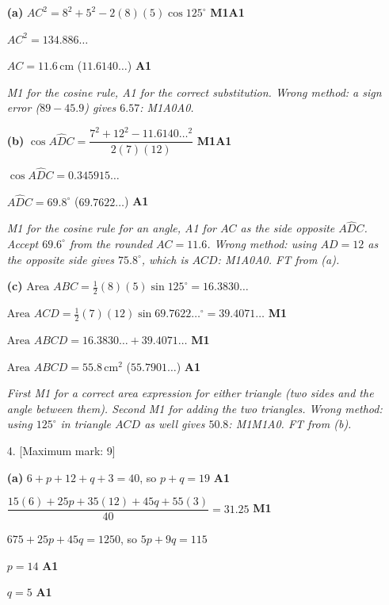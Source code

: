 \documentclass[12pt, twoside]{article}
\begin{document}
\begin{enumerate}[itemsep=0.3cm]
\textbf{(a)} $AC^{2} = 8^{2} + 5^{2} - 2(8)(5)\cos 125^\circ$ \hfill \textbf{M1A1}

$AC^{2} = 134.886\ldots$

$AC = 11.6\,\text{cm}$ \quad ($11.6140\ldots$) \hfill \textbf{A1}

\emph{M1 for the cosine rule, A1 for the correct substitution. Wrong method:
a sign error ($89 - 45.9$) gives $6.57$: M1A0A0.}

\textbf{(b)} $\cos A\hat{D}C = \dfrac{7^{2} + 12^{2} - 11.6140\ldots^{2}}{2(7)(12)}$ \hfill \textbf{M1A1}

$\cos A\hat{D}C = 0.345915\ldots$

$A\hat{D}C = 69.8^\circ$ \quad ($69.7622\ldots$) \hfill \textbf{A1}

\emph{M1 for the cosine rule for an angle, A1 for $AC$ as the side opposite
$A\hat{D}C$. Accept $69.6^\circ$ from the rounded $AC = 11.6$. Wrong method:
using $AD = 12$ as the opposite side gives $75.8^\circ$, which is
$A\hat{C}D$: M1A0A0. FT from (a).}

\textbf{(c)} $\text{Area } ABC = \frac{1}{2}(8)(5)\sin 125^\circ = 16.3830\ldots$

$\text{Area } ACD = \frac{1}{2}(7)(12)\sin 69.7622\ldots^\circ = 39.4071\ldots$ \hfill \textbf{M1}

$\text{Area } ABCD = 16.3830\ldots + 39.4071\ldots$ \hfill \textbf{M1}

$\text{Area } ABCD = 55.8\,\text{cm}^{2}$ \quad ($55.7901\ldots$) \hfill \textbf{A1}

\emph{First M1 for a correct area expression for either triangle (two sides
and the angle between them). Second M1 for adding the two triangles. Wrong
method: using $125^\circ$ in triangle $ACD$ as well gives $50.8$: M1M1A0.
FT from (b).}

\newpage

\item[4.] [Maximum mark: 9]

\textbf{(a)} $6 + p + 12 + q + 3 = 40$, so $p + q = 19$ \hfill \textbf{A1}

$\dfrac{15(6) + 25p + 35(12) + 45q + 55(3)}{40} = 31.25$ \hfill \textbf{M1}

$675 + 25p + 45q = 1250$, so $5p + 9q = 115$

$p = 14$ \hfill \textbf{A1}

$q = 5$ \hfill \textbf{A1}


\end{enumerate}
\end{document}
